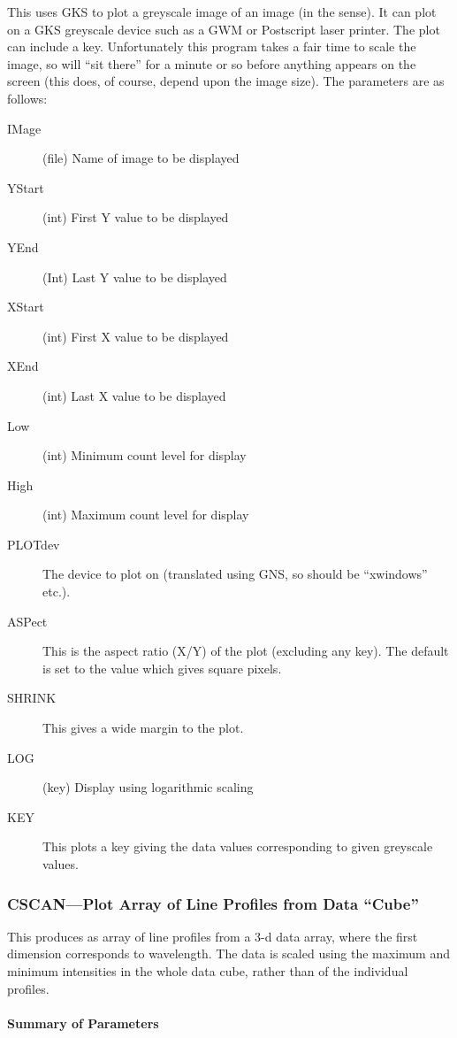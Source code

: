 This uses GKS to plot a greyscale image of an image (in the 
sense). It can plot on a GKS greyscale device such as a GWM or
Postscript laser printer.
The plot can include a key. Unfortunately this
program takes a fair time to scale the image, so will ``sit there''
for a minute or so before anything appears on the screen (this does, of
course, depend upon the image size). The parameters are as follows:
\begin{description}
\item[IMage] (file) Name of image to be displayed 
\item[YStart] (int) First Y value to be displayed 
\item[YEnd] (Int) Last Y value to be displayed 
\item[XStart] (int) First X value to be displayed 
\item[XEnd] (int) Last X value to be displayed 
\item[Low] (int) Minimum count level for display 
\item[High] (int) Maximum count level for display 
\item[PLOTdev] The device to plot on (translated using GNS, so
should be ``xwindows'' etc.).
\item[ASPect] This is the aspect ratio (X/Y) of the plot (excluding
any key). The default is set to the value which gives square pixels.
\item[SHRINK] This gives a wide margin to the plot.
\item[LOG] (key) Display using logarithmic scaling 
\item[KEY] This plots a key giving the data values corresponding to
given greyscale values.
\end{description}

\subsubsection{CSCAN---Plot Array of Line Profiles from Data ``Cube''}

This produces as array of line profiles from a 3-d data array, where
the first dimension corresponds to wavelength. The data is scaled using
the maximum and minimum intensities in the whole data cube, rather than
of the individual profiles.

\paragraph{Summary of Parameters}

